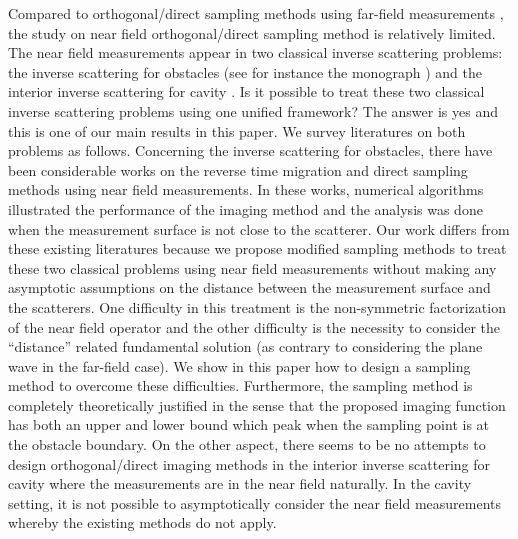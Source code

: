 \documentclass[final]{siamltex}
\begin{document}
Compared to orthogonal/direct sampling methods using  far-field measurements \cite{potthast2010study,griesmaier2011multi,LiuIP17,harris2020orthogonality}, the study on near field orthogonal/direct sampling method is relatively limited. The near field measurements appear in two classical inverse scattering problems:  the  inverse scattering for obstacles (see for instance the monograph \cite{CK}) and the interior inverse scattering for cavity \cite{QCo2,QCa,L,CaCoMe,MHC}. Is it possible to treat these two classical inverse scattering problems using one unified framework? The answer is yes and this is one of our main results in this paper.  We survey literatures on both  problems as follows. Concerning the inverse scattering for obstacles, there have been considerable works on the reverse time migration \cite{CCH2013} and  direct sampling methods \cite{ItoJinZou} using  near field measurements. In these works, numerical algorithms illustrated the performance of the imaging method and the analysis was done when the measurement surface is not close to the scatterer. Our work differs from these existing literatures because we propose modified sampling methods to treat these two classical problems using near field measurements without making any asymptotic assumptions on the distance between the measurement surface and the scatterers.
%
One difficulty in this treatment is the non-symmetric factorization \cite{Hu2014,MHC} of the near field operator and the other difficulty is the necessity to consider the ``distance'' related fundamental solution (as contrary to considering the plane wave in the far-field case). We show in this paper how to design a sampling method to overcome these difficulties. Furthermore, the sampling method is completely theoretically justified in the sense that the proposed imaging function has both an upper and lower bound which peak when the sampling point is at the obstacle boundary. On the other aspect, there seems to be no attempts to design orthogonal/direct imaging methods in the interior inverse scattering for cavity where the measurements are in the near field naturally. In the cavity setting, it is not possible to asymptotically consider the near field measurements  whereby the existing methods \cite{CCH2013,ItoJinZou} do not apply.
\end{document}
